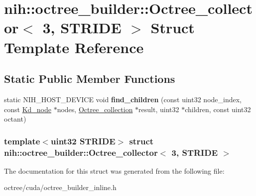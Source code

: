 \hypertarget{structnih_1_1octree__builder_1_1_octree__collector_3_013_00_01_s_t_r_i_d_e_01_4}{
\section{nih\-:\-:octree\-\_\-builder\-:\-:\-Octree\-\_\-collector$<$ 3, \-S\-T\-R\-I\-D\-E $>$ \-Struct \-Template \-Reference}
\label{structnih_1_1octree__builder_1_1_octree__collector_3_013_00_01_s_t_r_i_d_e_01_4}
}
\subsection*{\-Static \-Public \-Member \-Functions}
\begin{DoxyCompactItemize}
\item 
\hypertarget{structnih_1_1octree__builder_1_1_octree__collector_3_013_00_01_s_t_r_i_d_e_01_4_a71048b15407d500222934f16e665f912}{
static \-N\-I\-H\-\_\-\-H\-O\-S\-T\-\_\-\-D\-E\-V\-I\-C\-E void {\bfseries find\-\_\-children} (const uint32 node\-\_\-index, const \hyperlink{structnih_1_1_bintree__node}{\-Kd\-\_\-node} $\ast$nodes, \hyperlink{structnih_1_1octree__builder_1_1_octree__collection}{\-Octree\-\_\-collection} $\ast$result, uint32 $\ast$children, const uint32 octant)}
\label{structnih_1_1octree__builder_1_1_octree__collector_3_013_00_01_s_t_r_i_d_e_01_4_a71048b15407d500222934f16e665f912}

\end{DoxyCompactItemize}
\subsubsection*{template$<$uint32 \-S\-T\-R\-I\-D\-E$>$ struct nih\-::octree\-\_\-builder\-::\-Octree\-\_\-collector$<$ 3, S\-T\-R\-I\-D\-E $>$}



\-The documentation for this struct was generated from the following file\-:\begin{DoxyCompactItemize}
\item 
octree/cuda/octree\-\_\-builder\-\_\-inline.\-h\end{DoxyCompactItemize}
